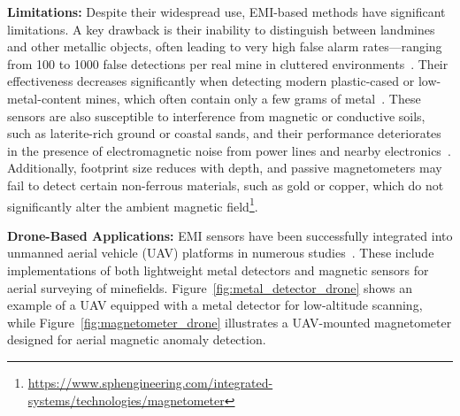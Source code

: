 \textbf{Limitations:} Despite their widespread use, EMI-based methods have significant limitations. A key drawback is their inability to distinguish between landmines and other metallic objects, often leading to very high false alarm rates—ranging from 100 to 1000 false detections per real mine in cluttered environments~\cite{Bruschini1997ASO, robledo2009survey}. Their effectiveness decreases significantly when detecting modern plastic-cased or low-metal-content mines, which often contain only a few grams of metal~\cite{gichd2006guidebook}. These sensors are also susceptible to interference from magnetic or conductive soils, such as laterite-rich ground or coastal sands, and their performance deteriorates in the presence of electromagnetic noise from power lines and nearby electronics~\cite{gichd2006guidebook}. Additionally, footprint size reduces with depth, and passive magnetometers may fail to detect certain non-ferrous materials, such as gold or copper, which do not significantly alter the ambient magnetic field\footnote{\url{https://www.sphengineering.com/integrated-systems/technologies/magnetometer}}.

\textbf{Drone-Based Applications:} EMI sensors have been successfully integrated into unmanned aerial vehicle (UAV) platforms in numerous studies~\cite{yoo2020drone,7529819,mu2020automatic,yoo2021application,BARNAWI2022441,rs15153813,barnawi2023graph,Barnawi2023ADL,s21093175,9251007,Safatly04032021,10745471,Stankevich2024OpticalAM,Joo2022OptimizationDM,rs16162916,Yoo2024UnmannedAV,rs16244732,Poliachenko_Kozak_Bakhmutov_Cherkes_Bilyi_2025}. These include implementations of both lightweight metal detectors and magnetic sensors for aerial surveying of minefields. Figure~\ref{fig:metal_detector_drone} shows an example of a UAV equipped with a metal detector for low-altitude scanning, while Figure~\ref{fig:magnetometer_drone} illustrates a UAV-mounted magnetometer designed for aerial magnetic anomaly detection. 

